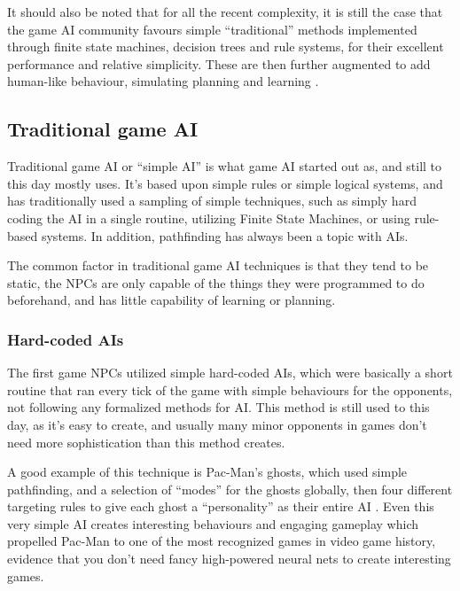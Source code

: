 \documentclass[]{report}
\begin{document}
It should also be noted that for all the recent complexity, it is still the case
that the game AI community favours simple ``traditional'' methods implemented
through finite state machines, decision trees and rule systems, for their
excellent performance and relative simplicity. These are then further augmented
to add human-like behaviour, simulating planning and learning
\citep[see][]{orkin2003applying,isla2002new,khoo2002efficient,mateas2002behavior}.

\subsection{Traditional game AI}
\label{sec:traditional-game-ai}

Traditional game AI or ``simple AI'' is what game AI started out as, and still
to this day mostly uses. It's based upon simple rules or simple logical systems,
and has traditionally used a sampling of simple techniques, such as simply hard
coding the AI in a single routine, utilizing Finite State Machines, or using
rule-based systems. In addition, pathfinding has always been a topic with AIs.

The common factor in traditional game AI techniques is that they tend to be
static, the NPCs are only capable of the things they were programmed to do
beforehand, and has little capability of learning or planning.


\subsubsection{Hard-coded AIs}
\label{sec:hard-coded-ais}

The first game NPCs utilized simple hard-coded AIs, which were basically a short
routine that ran every tick of the game with simple behaviours for the
opponents, not following any formalized methods for AI. This method is still
used to this day, as it's easy to create, and usually many minor opponents in
games don't need more sophistication than this method creates.

A good example of this technique is Pac-Man's ghosts, which used simple
pathfinding, and a selection of ``modes'' for the ghosts globally, then four
different targeting rules to give each ghost a ``personality'' as their entire
AI \citep{birch2010pacman,pittmanpac}. Even this very simple AI creates
interesting behaviours and engaging gameplay which propelled Pac-Man to one of
the most recognized games in video game history, evidence that you don't need
fancy high-powered neural nets to create interesting games.
\end{document}
